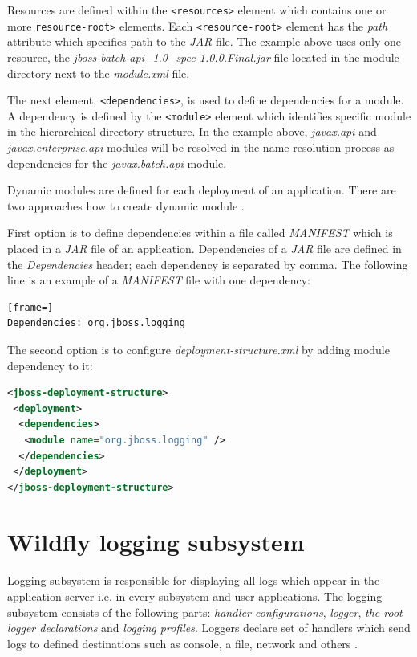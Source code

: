 \documentclass[12pt,oneside]{fithesis2}
\begin{document}
Resources are defined within the \verb|<resources>| element which contains one or more \verb|resource-root>| elements. Each \verb|<resource-root>| element has the \textit{path} attribute which specifies path to the \textit{JAR} file. The example above uses only one resource, the \textit{jboss-batch-api\_1.0\_spec-1.0.0.Final.jar} file located in the module directory next to the \textit{module.xml} file.

The next element, \verb|<dependencies>|, is used to define dependencies for a module. A dependency is defined by the \verb|<module>| element which identifies specific module in the hierarchical directory structure. In the example above, \textit{javax.api} and \textit{javax.enterprise.api} modules will be resolved in the name resolution process as dependencies for the \textit{javax.batch.api} module.

Dynamic modules are defined for each deployment of an application. There are two approaches how to create dynamic module \cite{wildfly_book}.

First option is to define dependencies within a file called \textit{MANIFEST} which is placed in a \textit{JAR} file of an application. Dependencies of a \textit{JAR} file are defined in the \textit{Dependencies} header; each dependency is separated by comma. The following line is an example of a \textit{MANIFEST} file with one dependency:

\begin{lstlisting}[frame=]
Dependencies: org.jboss.logging
\end{lstlisting}

\newpage
The second option is to configure \textit{deployment-structure.xml} by adding module dependency to it:

\begin{lstlisting}[caption = Configuring deployment structure file \cite{wildfly_book}, label = dynamic_module_descriptor, language=XML]
<jboss-deployment-structure>
 <deployment>
  <dependencies>
   <module name="org.jboss.logging" />
  </dependencies>
 </deployment>
</jboss-deployment-structure>
\end{lstlisting}

\section{Wildfly logging subsystem}
\label{wildfly_logging}
Logging subsystem is responsible for displaying all logs which appear in the application server i.e. in every subsystem and user applications. The logging subsystem consists of the following parts: \textit{handler configurations}, \textit{logger}, \textit{the root logger declarations} and \textit{logging profiles}. Loggers declare set of handlers which send logs to defined destinations such as console, a file, network and others \cite[Logging Configuration]{wildfly_doc}.
\end{document}
